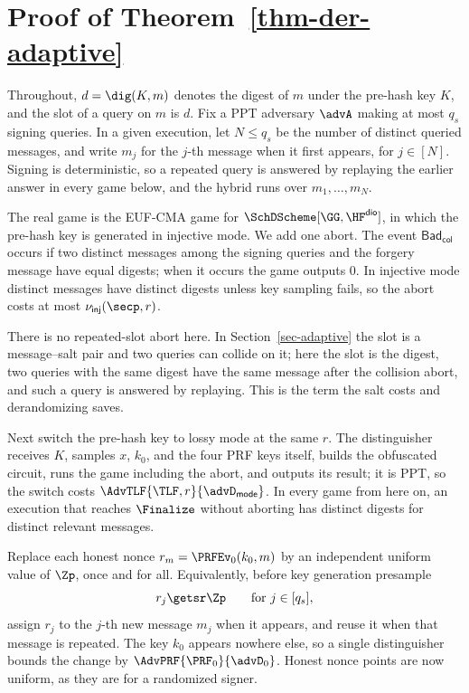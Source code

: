 \section{Proof of Theorem~\ref{thm-der-adaptive}} \label{app-derand}

Throughout, $d = \dig(K,m)$ denotes the digest of $m$ under the pre-hash key $K$, and the slot of a query on $m$ is $d$. Fix a PPT adversary $\advA$ making at most $q_s$ signing queries. In a given execution, let $N\le q_s$ be the number of distinct queried messages, and write $m_j$ for the $j$-th message when it first appears, for $j\in[N]$. Signing is deterministic, so a repeated query is answered by replaying the earlier answer in every game below, and the hybrid runs over $m_1,\ldots,m_N$.

 The real game is the EUF-CMA game for $\SchDScheme[\GG,\HF^{\mathsf{dio}}]$, in which the pre-hash key is generated in injective mode. We add one abort. The event $\mathsf{Bad}_{\mathsf{col}}$ occurs if two distinct messages among the signing queries and the forgery message have equal digests; when it occurs the game outputs 0. In injective mode distinct messages have distinct digests unless key sampling fails, so the abort costs at most $\nu_{\mathsf{inj}}(\secp,r)$.

There is no repeated-slot abort here. In Section~\ref{sec-adaptive} the slot is a message--salt pair and two queries can collide on it; here the slot is the digest, two queries with the same digest have the same message after the collision abort, and such a query is answered by replaying. This is the term the salt costs and derandomizing saves.

Next switch the pre-hash key to lossy mode at the same $r$. The distinguisher receives $K$, samples $x$, $k_0$, and the four PRF keys itself, builds the obfuscated circuit, runs the game including the abort, and outputs its result; it is PPT, so the switch costs $\AdvTLF{\TLF,r}{\advD_{\mathsf{mode}}}$. In every game from here on, an execution that reaches $\Finalize$ without aborting has distinct digests for distinct relevant messages.

 Replace each honest nonce $r_m = \PRFEv_0(k_0,m)$ by an independent uniform value of $\Zp$, once and for all. Equivalently, before key generation presample
$$
r_j\getsr\Zp\qquad\text{for }j\in[q_s],
$$
assign $r_j$ to the $j$-th new message $m_j$ when it appears, and reuse it when that message is repeated. The key $k_0$ appears nowhere else, so a single distinguisher bounds the change by $\AdvPRF{\PRF_0}{\advD_0}$. Honest nonce points are now uniform, as they are for a randomized signer.

